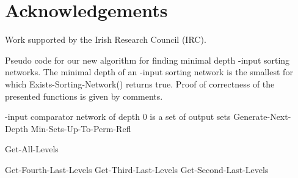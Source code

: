 \documentclass[13pt,a4paper]{article}
\begin{document}
\section{Acknowledgements}



Work supported by the Irish Research Council (IRC).










\begin{algorithm} [H]
\caption{Pseudo code for our new algorithm for finding minimal depth -input sorting networks. The minimal depth of an -input sorting network is the smallest  for which Exists-Sorting-Network() returns true. Proof of correctness of the presented functions is given by comments.}
\label{algo:MinDepthSortNet}
\begin{algorithmic} [1]
\State  -input comparator network of depth 0
\State 
\Comment  is a set of output sets
\For{}
	\State  Generate-Next-Depth
	\State  Min-Sets-Up-To-Perm-Refl
\EndFor

\If{}
	\If{}
		\State \Return 
	\EndIf
\EndIf
\State \Return 
\EndFunction

\State

\State 
{}
\ForAll{}
	\State  Get-All-Levels
	\ForAll{  }
		\State   
	\EndFor
\EndFor
\State \Return 
{}
\EndFunction

\State

\State 
{}
\If{  }
	\State \Return Get-Fourth-Last-Levels
\EndIf
\If{  }
	\State \Return Get-Third-Last-Levels
\EndIf
\If{  }
	\State \Return Get-Second-Last-Levels
\EndIf
\State \Return 
{}
\EndFunction
\end{algorithmic}
\end{algorithm}
\end{document}

